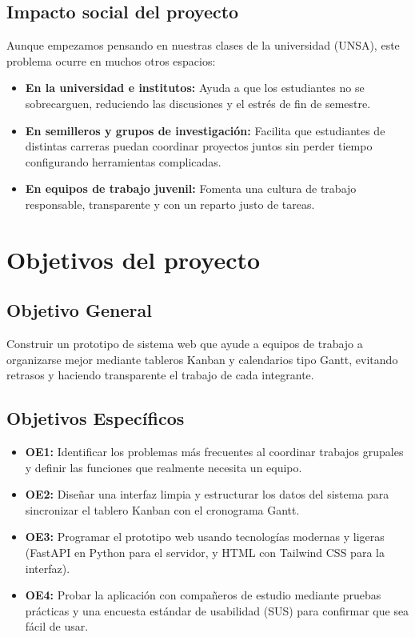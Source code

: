 \documentclass[11pt,a4paper]{article}
\begin{document}
\subsection{Impacto social del proyecto}
Aunque empezamos pensando en nuestras clases de la universidad (UNSA), este problema ocurre en muchos otros espacios:
\begin{itemize}
    \item \textbf{En la universidad e institutos:} Ayuda a que los estudiantes no se sobrecarguen, reduciendo las discusiones y el estrés de fin de semestre.
    \item \textbf{En semilleros y grupos de investigación:} Facilita que estudiantes de distintas carreras puedan coordinar proyectos juntos sin perder tiempo configurando herramientas complicadas.
    \item \textbf{En equipos de trabajo juvenil:} Fomenta una cultura de trabajo responsable, transparente y con un reparto justo de tareas.
\end{itemize}

\section{Objetivos del proyecto}

\subsection{Objetivo General}
Construir un prototipo de sistema web que ayude a equipos de trabajo a organizarse mejor mediante tableros Kanban y calendarios tipo Gantt, evitando retrasos y haciendo transparente el trabajo de cada integrante.

\subsection{Objetivos Específicos}
\begin{itemize}
    \item \textbf{OE1:} Identificar los problemas más frecuentes al coordinar trabajos grupales y definir las funciones que realmente necesita un equipo.
    \item \textbf{OE2:} Diseñar una interfaz limpia y estructurar los datos del sistema para sincronizar el tablero Kanban con el cronograma Gantt.
    \item \textbf{OE3:} Programar el prototipo web usando tecnologías modernas y ligeras (FastAPI en Python para el servidor, y HTML con Tailwind CSS para la interfaz).
    \item \textbf{OE4:} Probar la aplicación con compañeros de estudio mediante pruebas prácticas y una encuesta estándar de usabilidad (SUS) para confirmar que sea fácil de usar.
\end{itemize}
\end{document}
